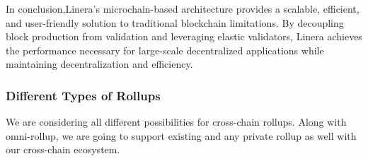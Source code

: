 In conclusion,Linera’s microchain-based architecture provides a scalable, efficient, and user-friendly solution to traditional blockchain limitations. By decoupling block production from validation and leveraging elastic validators, Linera achieves the performance necessary for large-scale decentralized applications while maintaining decentralization and efficiency.



\subsubsection{Different Types of Rollups}
We are considering all different possibilities for cross-chain rollups. Along with omni-rollup, we are going to support existing and any private rollup as well with our cross-chain ecosystem. 

